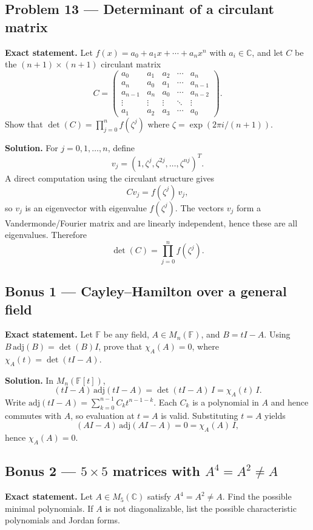 \documentclass[12pt,a4paper]{article}
\theoremstyle{plain}
\theoremstyle{definition}      %
\begin{document}
\subsection*{Problem 13 — Determinant of a circulant matrix}

\textbf{Exact statement.}
Let $f(x)=a_0+a_1x+\cdots +a_n x^n$ with $a_i\in\mathbb C$, and let $C$ be the $(n+1)\times(n+1)$ circulant matrix
\[
C=\begin{pmatrix}
	a_0&a_1&a_2&\cdots&a_n\\
	a_n&a_0&a_1&\cdots&a_{n-1}\\
	a_{n-1}&a_n&a_0&\cdots&a_{n-2}\\
	\vdots&\vdots&\vdots&\ddots&\vdots\\
	a_1&a_2&a_3&\cdots&a_0
\end{pmatrix}.
\]
Show that $\det(C)=\prod_{j=0}^{n} f(\zeta^j)$ where $\zeta=\exp(2\pi i/(n+1))$.

\textbf{Solution.}
For $j=0,1,\dots,n$, define
\[
v_j=(1,\zeta^j,\zeta^{2j},\dots,\zeta^{nj})^T.
\]
A direct computation using the circulant structure gives
\[
Cv_j=f(\zeta^j)\,v_j,
\]
so $v_j$ is an eigenvector with eigenvalue $f(\zeta^j)$.
The vectors $v_j$ form a Vandermonde/Fourier matrix and are linearly independent, hence these are all eigenvalues.
Therefore
\[
\det(C)=\prod_{j=0}^{n} f(\zeta^j).
\]

\subsection*{Bonus 1 — Cayley--Hamilton over a general field}

\textbf{Exact statement.}
Let $\mathbb F$ be any field, $A\in M_n(\mathbb F)$, and $B=tI-A$.
Using $B\,\mathrm{adj}(B)=\det(B)I$, prove that $\chi_A(A)=0$, where $\chi_A(t)=\det(tI-A)$.

\textbf{Solution.}
In $M_n(\mathbb F[t])$,
\[
(tI-A)\,\mathrm{adj}(tI-A)=\det(tI-A)\,I=\chi_A(t)\,I.
\]
Write $\mathrm{adj}(tI-A)=\sum_{k=0}^{n-1} C_k t^{n-1-k}$.
Each $C_k$ is a polynomial in $A$ and hence commutes with $A$, so evaluation at $t=A$ is valid.
Substituting $t=A$ yields
\[
(AI-A)\,\mathrm{adj}(AI-A)=0=\chi_A(A)\,I,
\]
hence $\chi_A(A)=0$.

\subsection*{Bonus 2 — $5\times5$ matrices with $A^4=A^2\neq A$}

\textbf{Exact statement.}
Let $A\in M_5(\mathbb C)$ satisfy $A^4=A^2\neq A$.
Find the possible minimal polynomials. If $A$ is not diagonalizable, list the possible characteristic polynomials and Jordan forms.
\end{document}

